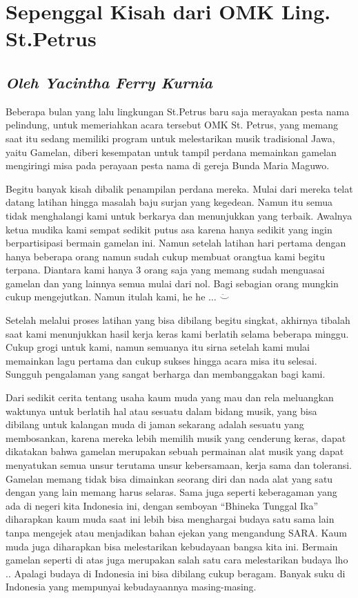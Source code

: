 \newpage
\section*{Sepenggal Kisah dari OMK Ling. St.Petrus}
\subsection*{\emph{Oleh Yacintha Ferry Kurnia}}

Beberapa bulan yang lalu lingkungan St.Petrus baru saja merayakan pesta nama pelindung, untuk memeriahkan acara tersebut OMK St. Petrus, yang memang saat itu sedang memiliki program untuk melestarikan musik tradisional Jawa, yaitu Gamelan, diberi kesempatan untuk tampil perdana memainkan gamelan mengiringi misa pada perayaan pesta nama di gereja Bunda Maria Maguwo. 

	Begitu banyak kisah dibalik penampilan perdana mereka. Mulai dari mereka telat datang latihan hingga masalah baju surjan yang kegedean. Namun itu semua tidak menghalangi kami untuk berkarya dan menunjukkan yang terbaik. Awalnya ketua mudika kami sempat sedikit putus asa karena hanya sedikit yang ingin berpartisipasi bermain gamelan ini. Namun setelah latihan hari pertama dengan hanya beberapa orang namun sudah cukup membuat orangtua kami begitu terpana. Diantara kami hanya 3 orang saja yang memang sudah menguasai gamelan dan yang lainnya semua mulai dari nol. Bagi sebagian orang mungkin cukup mengejutkan.  Namun itulah kami, he he $\ldots$ $\ddot\smile$

	Setelah melalui proses latihan yang bisa dibilang begitu singkat, akhirnya tibalah saat kami menunjukkan hasil kerja keras kami berlatih selama beberapa minggu. Cukup grogi untuk kami, namun semuanya itu sirna setelah kami mulai memainkan lagu pertama dan cukup sukses hingga acara misa itu selesai. Sungguh pengalaman yang sangat berharga dan membanggakan bagi kami.

	Dari sedikit cerita tentang usaha kaum muda yang mau dan rela meluangkan waktunya untuk berlatih  hal atau sesuatu dalam bidang musik, yang bisa dibilang untuk kalangan muda di jaman sekarang adalah sesuatu yang membosankan, karena mereka lebih memilih musik yang cenderung keras, dapat dikatakan bahwa gamelan merupakan sebuah permainan alat musik yang dapat menyatukan semua unsur  terutama unsur kebersamaan, kerja sama dan toleransi. Gamelan memang tidak bisa dimainkan seorang diri dan nada alat yang satu dengan yang lain memang harus selaras. Sama juga seperti keberagaman yang ada di negeri kita Indonesia ini, dengan semboyan “Bhineka Tunggal Ika” diharapkan kaum muda saat ini lebih bisa menghargai budaya satu sama lain tanpa mengejek atau menjadikan bahan ejekan yang mengandung SARA. Kaum muda juga diharapkan bisa melestarikan kebudayaan bangsa kita ini. Bermain gamelan seperti di atas juga merupakan salah satu cara melestarikan budaya lho .. Apalagi budaya di Indonesia ini bisa dibilang cukup beragam. Banyak suku di Indonesia yang mempunyai kebudayaannya masing-masing.

